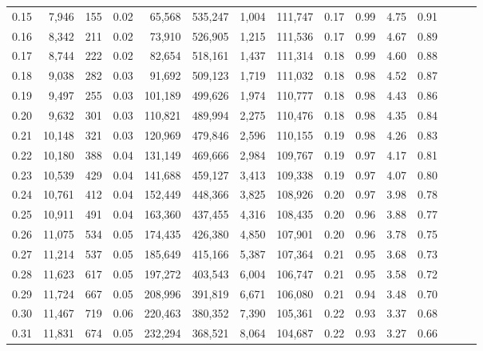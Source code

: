 \begin{tabular}{rrrrrrrrrrrrrrr}
0.15 &   7,946 &    155 &  0.02 &   65,568 &  535,247 &    1,004 &  111,747 &  0.17 &  0.99 &  4.75 &      0.91 \\
0.16 &   8,342 &    211 &  0.02 &   73,910 &  526,905 &    1,215 &  111,536 &  0.17 &  0.99 &  4.67 &      0.89 \\
0.17 &   8,744 &    222 &  0.02 &   82,654 &  518,161 &    1,437 &  111,314 &  0.18 &  0.99 &  4.60 &      0.88 \\
0.18 &   9,038 &    282 &  0.03 &   91,692 &  509,123 &    1,719 &  111,032 &  0.18 &  0.98 &  4.52 &      0.87 \\
0.19 &   9,497 &    255 &  0.03 &  101,189 &  499,626 &    1,974 &  110,777 &  0.18 &  0.98 &  4.43 &      0.86 \\
0.20 &   9,632 &    301 &  0.03 &  110,821 &  489,994 &    2,275 &  110,476 &  0.18 &  0.98 &  4.35 &      0.84 \\
0.21 &  10,148 &    321 &  0.03 &  120,969 &  479,846 &    2,596 &  110,155 &  0.19 &  0.98 &  4.26 &      0.83 \\
0.22 &  10,180 &    388 &  0.04 &  131,149 &  469,666 &    2,984 &  109,767 &  0.19 &  0.97 &  4.17 &      0.81 \\
0.23 &  10,539 &    429 &  0.04 &  141,688 &  459,127 &    3,413 &  109,338 &  0.19 &  0.97 &  4.07 &      0.80 \\
0.24 &  10,761 &    412 &  0.04 &  152,449 &  448,366 &    3,825 &  108,926 &  0.20 &  0.97 &  3.98 &      0.78 \\
0.25 &  10,911 &    491 &  0.04 &  163,360 &  437,455 &    4,316 &  108,435 &  0.20 &  0.96 &  3.88 &      0.77 \\
0.26 &  11,075 &    534 &  0.05 &  174,435 &  426,380 &    4,850 &  107,901 &  0.20 &  0.96 &  3.78 &      0.75 \\
0.27 &  11,214 &    537 &  0.05 &  185,649 &  415,166 &    5,387 &  107,364 &  0.21 &  0.95 &  3.68 &      0.73 \\
0.28 &  11,623 &    617 &  0.05 &  197,272 &  403,543 &    6,004 &  106,747 &  0.21 &  0.95 &  3.58 &      0.72 \\
0.29 &  11,724 &    667 &  0.05 &  208,996 &  391,819 &    6,671 &  106,080 &  0.21 &  0.94 &  3.48 &      0.70 \\
0.30 &  11,467 &    719 &  0.06 &  220,463 &  380,352 &    7,390 &  105,361 &  0.22 &  0.93 &  3.37 &      0.68 \\
0.31 &  11,831 &    674 &  0.05 &  232,294 &  368,521 &    8,064 &  104,687 &  0.22 &  0.93 &  3.27 &      0.66 \\

\end{tabular}
